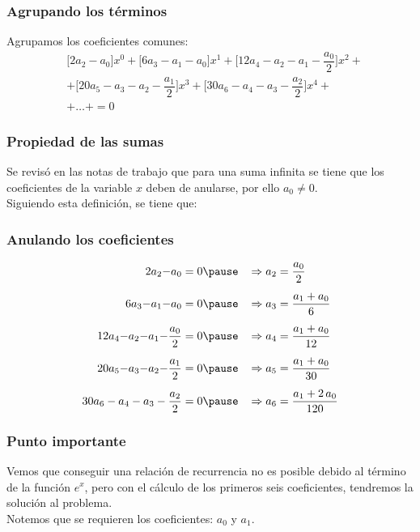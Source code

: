\documentclass[12pt]{beamer}
\begin{document}
\begin{frame}
\frametitle{Agrupando los términos}
Agrupamos los coeficientes comunes:
\pause
\begin{align*}
&\big[2 a_{2} {-} a_{0}\big] x^{0} + \big[6 a_{3} {-} a_{1} {-} a_{0}\big] x^{1} + \big[12 a_{4} {-} a_{2} {-} a_{1} {-} \dfrac{a_{0}}{2} \big] x^{2} + \\[0.5em]
&+ \big[ 20 a_{5} {-}a_{3} {-} a_{2} {-} \dfrac{a_{1}}{2} \big] x^{3} + \big[ 30 a_{6} - a_{4} - a_{3} - \dfrac{a_{2}}{2} \big] x^{4} + \\[0.5em]
&+ \ldots + = 0
\end{align*}
\end{frame}
\begin{frame}
\frametitle{Propiedad de las sumas}
Se revisó en las notas de trabajo que para una suma infinita se tiene que los coeficientes de la variable $x$ deben de anularse, por ello $a_{0} \neq 0$.
\\
\bigskip
\pause
Siguiendo esta definición, se tiene que:
\end{frame}
\begin{frame}
\frametitle{Anulando los coeficientes}
\begin{eqnarray*}
\begin{aligned}
2 a_{2} {-} a_{0} &= 0 \pause \hspace{0.3cm} \Rightarrow a_{2} = \dfrac{a_{0}}{2} \\[0.5em]
6 a_{3} {-} a_{1} {-} a_{0} &= 0 \pause \hspace{0.3cm} \Rightarrow a_{3} = \dfrac{a_{1} + a_{0}}{6} \\[0.5em]
12 a_{4} {-} a_{2} {-} a_{1} {-} \dfrac{a_{0}}{2} &= 0 \pause \hspace{0.3cm} \Rightarrow a_{4} = \dfrac{a_{1} + a_{0}}{12} \\[0.5em]
20 a_{5} {-}a_{3} {-} a_{2} {-} \dfrac{a_{1}}{2} &= 0 \pause \hspace{0.3cm} \Rightarrow a_{5} = \dfrac{a_{1} + a_{0}}{30} \\[0.5em]
30 a_{6} - a_{4} - a_{3} - \dfrac{a_{2}}{2} &= 0 \pause \hspace{0.3cm} \Rightarrow a_{6} = \dfrac{a_{1} + 2 \, a_{0}}{120}
\end{aligned}
\end{eqnarray*}
\end{frame}
\begin{frame}
\frametitle{Punto importante}
Vemos que conseguir una relación de recurrencia no es posible debido al término de la función $e^{x}$, pero con el cálculo de los primeros seis coeficientes, tendremos la solución al problema.
\\
\bigskip
\pause
Notemos que se requieren los coeficientes: $a_{0}$ y $a_{1}$.
\end{frame}
\end{document}
